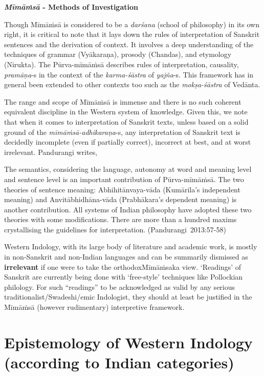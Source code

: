 \medskip
{\bf {\sl\bfseries Mīmāṁsā} - Methods of Investigation}

Though Mīmāṁsā is considered to be a {\sl darśana} (school of philosophy) in its own right, it is critical to note that it lays down the rules of interpretation of Sanskrit sentences and the derivation of context. It involves a deep understanding of the techniques of grammar (Vyākaraṇa), prosody (Chandas), and etymology (Nirukta). The Pūrva-mīmāṁsā describes rules of interpretation, causality, {\sl pramāṇa}-s in the context of the {\sl karma-śāstra} of {\sl yajña}-s. This framework has in general been extended to other contexts too such as the {\sl mokṣa-śāstra} of Vedānta.

The range and scope of Mīmāṁsā is immense and there is no such coherent equivalent discipline in the Western system of knowledge. Given this, we note that when it comes to interpretation of Sanskrit texts, unless based on a solid ground of the \hbox{{\sl mīmāṁsā-adhikaraṇa}-s,} any interpretation of Sanskrit text is decidedly incomplete (even if partially correct), incorrect at best, and at worst irrelevant. Pandurangi writes,
\begin{myquote}
The semantics, considering the language, autonomy at word and meaning level and sentence level is an important contribution of Pūrva-mīmāṁ\-sā. The two theories of sentence meaning: Abhihitānvaya-vāda (Kumārila's independent meaning) and Anvitābhidhāna-vāda (Prabhākara's dependent meaning) is another contribution. All systems of Indian philosophy have adopted these two theories with some modifications. There are more than a hundred maxims crystallising the guidelines for interpretation. \hfill \hbox{(Pandurangi 2013:57-58)}
\end{myquote}

Western Indology, with its large body of literature and academic work, is mostly in non-Sanskrit and non-Indian languages and can be summarily dismissed as {\bf irrelevant} if one were to take the orthodox\break Mīmāṁsaka view. `Readings' of Sanskrit are currently being done with `free-style' techniques like Pollockian philology. For such ``readings'' to be acknowledged as valid by any serious traditionalist/Swadeshi/\-emic Indologist, they should at least be justified in the Mīmāṁsā (however rudimentary) interpretive framework. 

\newpage

\section*{Epistemology of Western Indology (according to Indian categories)}

